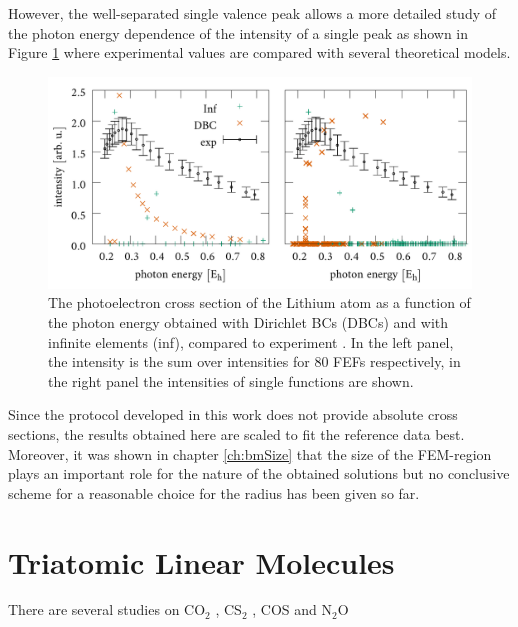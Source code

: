 However, the well-separated single valence peak allows a more detailed study of the photon energy dependence of the intensity of a single peak as shown in Figure \ref{fig:Li-CS} where experimental values are compared with several theoretical models.
\begin{figure}
\includegraphics[width=\textwidth]{Figures/Lithium/CrossSect2}
\caption{The photoelectron cross section of the Lithium atom as a function of the photon energy obtained with Dirichlet BCs (DBCs) and with infinite elements (inf), compared to experiment  \cite{LiCS}.
In the left panel, the intensity is the sum over intensities for $80$ FEFs respectively, in the right panel the intensities of single functions are shown.}
\label{fig:Li-CS}
\end{figure}
Since the protocol developed in this work does not provide absolute cross sections, the results obtained here are scaled to fit the reference data best.
Moreover, it was shown in chapter \ref{ch:bmSize} that the size of the FEM-region plays an important role for the nature of the obtained solutions but no conclusive scheme for a reasonable choice for the radius has been given so far.

\section{Triatomic Linear Molecules}
There are several studies on CO$_2$ \cite{CO2, CO2_highres, HighResLinear, DiffLinear}, CS$_2$ \cite{DiffLinear,HighResLinear}, COS \cite{DiffLinear,HighResLinear} and N$_2$O \cite{DiffLinear}

